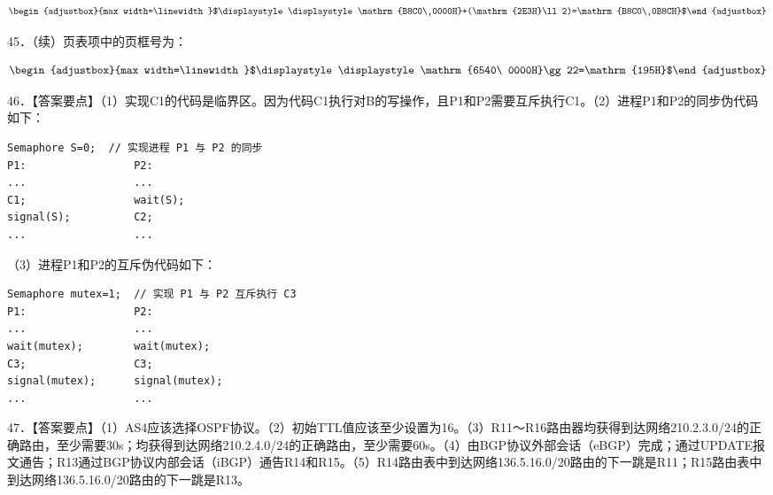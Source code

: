\documentclass[UTF8,11pt]{ctexart}
\newcommand{\fitmath}[1]{\begin{adjustbox}{max width=\linewidth}$\displaystyle #1$\end{adjustbox}}
\begin{document}
\[\fitmath{\displaystyle \mathrm{B8C0\ 0000H}+(\mathrm{2E3H}\ll2)=\mathrm{B8C0\ 0B8CH}}\]

45．（续）页表项中的页框号为：


\[\fitmath{\displaystyle \mathrm{6540\ 0000H}\gg22=\mathrm{195H}}\]

46．【答案要点】（1）实现C1的代码是临界区。因为代码C1执行对B的写操作，且P1和P2需要互斥执行C1。（2）进程P1和P2的同步伪代码如下：


\begin{Verbatim}[breaklines,breakanywhere,fontsize=\small]
Semaphore S=0;  // 实现进程 P1 与 P2 的同步
P1:                 P2:
...                 ...
C1;                 wait(S);
signal(S);          C2;
...                 ...
\end{Verbatim}

（3）进程P1和P2的互斥伪代码如下：


\begin{Verbatim}[breaklines,breakanywhere,fontsize=\small]
Semaphore mutex=1;  // 实现 P1 与 P2 互斥执行 C3
P1:                 P2:
...                 ...
wait(mutex);        wait(mutex);
C3;                 C3;
signal(mutex);      signal(mutex);
...                 ...
\end{Verbatim}

47．【答案要点】（1）AS4应该选择OSPF协议。（2）初始TTL值应该至少设置为16。（3）R11～R16路由器均获得到达网络210.2.3.0/24的正确路由，至少需要30s；均获得到达网络210.2.4.0/24的正确路由，至少需要60s。（4）由BGP协议外部会话（eBGP）完成；通过UPDATE报文通告；R13通过BGP协议内部会话（iBGP）通告R14和R15。（5）R14路由表中到达网络136.5.16.0/20路由的下一跳是R11；R15路由表中到达网络136.5.16.0/20路由的下一跳是R13。
\end{document}
